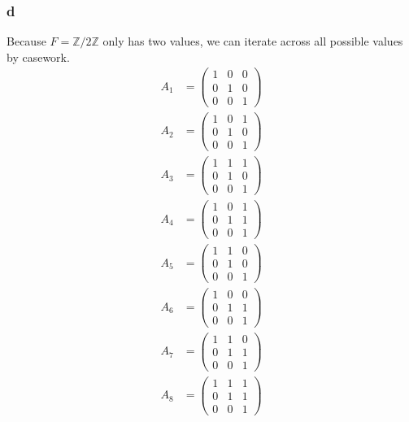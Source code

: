 \documentclass[11 pt]{article}
\theoremstyle{definition}
\theoremstyle{remark}
\begin{document}
\subsubsection*{d}
Because $F=\mathbb{Z}/2\mathbb{Z}$ only has two values, we can iterate across all possible values by casework.
\begin{align*}
A_1 &= \begin{pmatrix}
1 & 0 & 0\\
0 & 1 & 0\\
0 & 0 & 1
\end{pmatrix}
\\
A_2 &= \begin{pmatrix}
1 & 0 & 1\\
0 & 1 & 0\\
0 & 0 & 1
\end{pmatrix}
\\
A_3 &= \begin{pmatrix}
1 & 1 & 1\\
0 & 1 & 0\\
0 & 0 & 1
\end{pmatrix}
\\
A_4 &= \begin{pmatrix}
1 & 0 & 1\\
0 & 1 & 1\\
0 & 0 & 1
\end{pmatrix}
\\
A_5 &= \begin{pmatrix}
1 & 1 & 0\\
0 & 1 & 0\\
0 & 0 & 1
\end{pmatrix}
\\
A_6 &= \begin{pmatrix}
1 & 0 & 0\\
0 & 1 & 1\\
0 & 0 & 1
\end{pmatrix}
\\
A_7 &= \begin{pmatrix}
1 & 1 & 0\\
0 & 1 & 1\\
0 & 0 & 1
\end{pmatrix}
\\
A_8 &= \begin{pmatrix}
1 & 1 & 1\\
0 & 1 & 1\\
0 & 0 & 1
\end{pmatrix}
\\
\end{align*}
\end{document}
